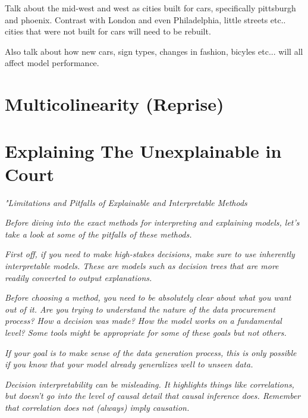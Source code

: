 Talk about the mid-west and west as cities built for cars, specifically pittsburgh and phoenix. Contrast with London and even Philadelphia, little streets etc.. cities that were not built for cars will need to be rebuilt.

Also talk about how new cars, sign types, changes in fashion, bicyles etc... will all affect model performance.

\section{Multicolinearity (Reprise)}


\section{Explaining The Unexplainable in Court}

\textit{"Limitations and Pitfalls of Explainable and Interpretable Methods}

\textit{Before diving into the exact methods for interpreting and explaining models, let's take a look at some of the pitfalls of these methods.}

\textit{First off, if you need to make high-stakes decisions, make sure to use inherently interpretable models. These are models such as decision trees that are more readily converted to output explanations.}

\textit{Before choosing a method, you need to be absolutely clear about what you want out of it. Are you trying to understand the nature of the data procurement process? How a decision was made? How the model works on a fundamental level? Some tools might be appropriate for some of these goals but not others.}

\textit{If your goal is to make sense of the data generation process, this is only possible if you know that your model already generalizes well to unseen data.}

\textit{Decision interpretability can be misleading. It highlights things like correlations, but doesn’t go into the level of causal detail that causal inference does. Remember that correlation does not (always) imply causation.}

